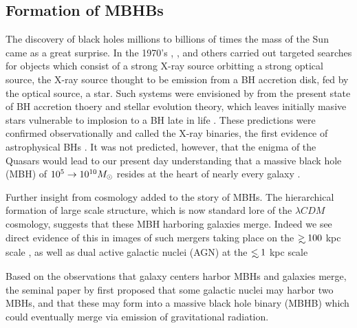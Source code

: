 \subsection{Formation of MBHBs}  
The discovery of black holes millions to billions of times the mass of the Sun
came as a great surprise. In the 1970's \cite{Giacconni}, \cite{Friedman}, and
others carried out targeted searches for objects which consist of a strong X-ray
source orbitting a strong optical source, the X-ray source thought to be
emission from a BH accretion disk, fed by the optical source, a star. Such
systems were envisioned by from the present state of BH accretion thoery and stellar evolution
theory, which leaves initially masive stars vulnerable to implosion to a BH late in
life \citep{}. These predictions were confirmed observationally and called the X-ray binaries, the first
evidence of astrophysical BHs \citep{}. It was not predicted, however, that
the enigma of the Quasars \citep[\emph{e.g.}][]{Schmidt:19XX, Saltpeter:1964,
LyndenBell:1969} would lead to our present day understanding that a massive
black hole (MBH) of $10^5 \rightarrow 10^{10} {M_{\odot}}$ resides at the heart of
nearly every galaxy \citep{KR95, KHo2015, FerrareseFord:2005}.

Further insight from cosmology added to the story of MBHs. The hierarchical
formation of large scale structure, which is now standard lore of the $\lambda
CDM$ \citep{LCDM} cosmology, suggests that these MBH harboring galaxies merge.
Indeed we see direct evidence of this in images of such mergers taking place
on the $\gsim 100$ kpc scale \citep[see][and references
therein]{Dotti:2012:rev}, as well as dual active galactic nuclei (AGN) at the
$\lsim 1$ kpc scale \citep{Komossa:2003, Fabbiano+2011, Rodriguez:2006, Burke-
Spolaor:2011, ColpiDotti:2009, Woo:2014}



Based on the observations that galaxy centers harbor MBHs and galaxies merge,
the seminal paper by \cite{Begel:Blan:Rees:1980} first proposed that some
galactic nuclei may harbor two MBHs, and that these may form into a massive
black hole binary (MBHB) which could eventually merge via emission of
gravitational radiation.

